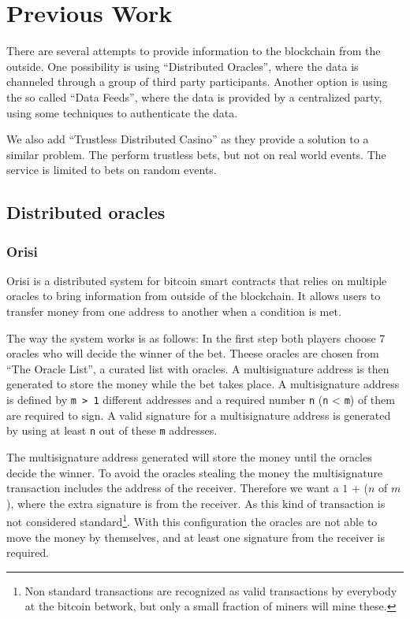 \section{Previous Work} \label{sec:previous_work}

There are several attempts to provide information to the blockchain from the
  outside.
One possibility is using  ``Distributed Oracles'', where the data is channeled
  through a group of third party participants.
Another option is using the so called ``Data Feeds'', where the data is provided
  by a centralized party, using some techniques to authenticate the data.

We also add ``Trustless Distributed Casino'' as they provide a solution to a
  similar problem.
The perform trustless bets, but not  on real world events.
The service is limited to bets on random events.

\subsection{Distributed oracles}
\subsubsection{Orisi}
Orisi \cite{orisiwhitepaper} is a distributed system for bitcoin smart
  contracts that relies on multiple oracles to bring information from outside
  of the blockchain.
It allows users to transfer money from one address to another when a condition
  is met.

The way the system works is as follows:
In the first step both players choose 7 oracles who will decide the winner of
  the bet.
Theese oracles are chosen from ``The Oracle List'', a curated list with oracles.
A multisignature address is then generated to store the money while the bet
  takes place.
A multisignature address is defined by \texttt{m > 1} different addresses and a
  required number \texttt{n} (\texttt{n} < \texttt{m}) of them are required to
  sign.
A valid signature for a multisignature address is generated by using at least
  \texttt{n} out of these \texttt{m} addresses.

The multisignature address generated will store the money until the oracles
  decide the winner.
To avoid the oracles stealing the money the multisignature transaction includes
  the address of the receiver.
Therefore we want a $1$ + ($n$ of $m$), where the extra signature is
  from the receiver.
As this kind of transaction is not considered
  standard\footnote{Non standard transactions are recognized as valid
  transactions by everybody at the bitcoin betwork, but only a small fraction of
  miners will mine these.}.
 With this configuration the oracles are
  not able to move the money by themselves, and at least one signature
  from the receiver is required.

